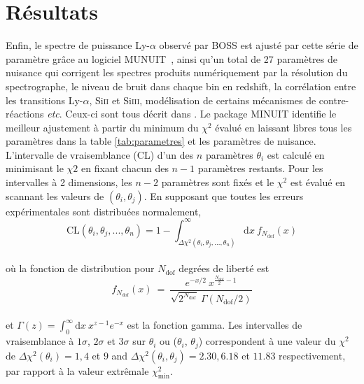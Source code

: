 \section{Résultats}

Enfin, le spectre de puissance Ly-$\alpha$ observé par BOSS est ajusté par cette série de paramètre grâce au logiciel \textsf{MUNUIT}~\cite{Minuit}, ainsi qu'un total de 27 paramètres de nuisance qui corrigent les spectres produits numériquement par la résolution du spectrographe, le niveau de bruit dans chaque bin en redshift, la corrélation entre les transitions Ly-$\alpha$, Si\textsc{ii} et Si\textsc{iii}, modélisation de certains mécanismes de contre-réactions \textit{etc}. Ceux-ci sont tous décrit dans \cite{Palanque2015a, Palanque2015b, Baur16}. Le package \textsf{MINUIT} identifie le meilleur ajustement à partir du minimum du $\chi^2$ évalué en laissant libres tous les paramètres dans la table \ref{tab:parametres} et les paramètres de nuisance. L'intervalle de vraisemblance (CL) d'un des $n$ paramètres $\theta_i$ est calculé en minimisant le $\chi2$ en fixant chacun des $n-1$ paramètres restants. Pour les intervalles à 2 dimensions, les $n-2$ paramètres sont fixés et le $\chi^2$ est évalué en scannant les valeurs de $(\theta_i, \theta_j)$. En supposant que toutes les erreurs expérimentales sont distribuées normalement, \\
\begin{equation}
\mathrm{CL}(\theta_i, \theta_j, ..., \theta_n) = 1 - \int_{\Delta \chi^2 (\theta_i, \theta_j, ..., \theta_n)}^{\infty} \mathrm{d} x ~ f_{N_{\mathrm{dof}}}(x)
\end{equation} \\ où la fonction de distribution pour $N_\mathrm{dof}$ degrées de liberté est \\
\begin{equation}
f_{N_{\mathrm{dof}}}(x) ~ = ~ \frac{e^{-x/2} ~ x^{\frac{N_{\mathrm{dof}}}{2}-1}}{\sqrt{2^{N_{\mathrm{dof}}}} ~ \Gamma (N_{\mathrm{dof}}/2)}
\end{equation} \\ et $\Gamma (z) = \displaystyle \int_{0}^{\infty} \mathrm{d}x~ x^{z-1} e^{-x}$ est la fonction gamma. Les intervalles de vraisemblance à $1\sigma$, $2\sigma$ et $3\sigma$ sur $\theta_i$ ou ($\theta_i$, $\theta_j$) correspondent à une valeur du $\chi^2$ de $\Delta \chi^2 (\theta_i) = 1, 4$ et $9$ and $\Delta \chi^2 (\theta_i, \theta_j) = 2.30, 6.18$ et $11.83$ respectivement, par rapport à la valeur extrêmale $\chi^2_\mathrm{min}$. \\

